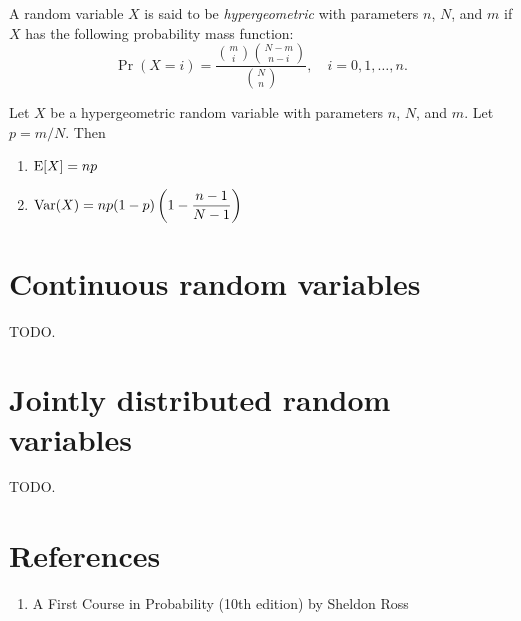 \documentclass{article}
\begin{document}
\begin{definition}
  A random variable $X$ is said to be \emph{hypergeometric} with parameters $n$, $N$, and $m$ if $X$ has the following probability mass function:
  \[
    \Pr(X = i) = \frac{\binom{m}{i} \binom{N - m}{n - i}}{\binom{N}{n}}, \quad i = 0, 1, \ldots, n.
  \]
\end{definition}

\begin{proposition}
  Let $X$ be a hypergeometric random variable with parameters $n$, $N$, and $m$.
  Let $p = m/N$.
  Then
  \begin{enumerate}
    \item $\operatorname{E}[X] = np$
    \item $\operatorname{Var}(X) = np(1 - p) \left(1 - \dfrac{n - 1}{N - 1} \right)$
  \end{enumerate}
\end{proposition}

\section{Continuous random variables}

TODO.

\section{Jointly distributed random variables}

TODO.

\section{References}

\begin{enumerate}
  \item A First Course in Probability (10th edition) by Sheldon Ross
\end{enumerate}
\end{document}
